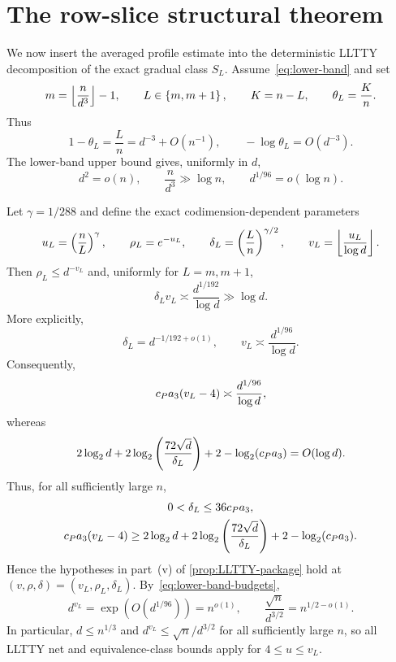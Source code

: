 \section{The row-slice structural theorem}\label{sec:structural}

We now insert the averaged profile estimate into the deterministic LLTTY decomposition of the exact gradual class $S_L$. Assume~\eqref{eq:lower-band} and set
\begin{equation}\label{eq:structural-parameters-basic}
  m=\left\lfloor \frac n{d^3}\right\rfloor-1,
  \qquad
  L\in\left\{m,m+1\right\},
  \qquad
  K=n-L,
  \qquad
  \theta_L=\frac Kn.
\end{equation}
Thus
\begin{equation}\label{eq:theta-L}
  1-\theta_L=\frac Ln=d^{-3}+O(n^{-1}),
  \qquad
  -\log\theta_L=O(d^{-3}).
\end{equation}
The lower-band upper bound gives, uniformly in $d$,
\begin{equation}\label{eq:lower-band-budgets}
  d^2=o(n),
  \qquad
  \frac n{d^3}\gg\log n,
  \qquad
  d^{1/96}=o(\log n).
\end{equation}

Let $\gamma=1/288$ and define the exact codimension-dependent parameters
\begin{equation}\label{eq:u-rho-delta-v}
  u_L=\left(\frac nL\right)^\gamma,
  \qquad
  \rho_L=e^{-u_L},
  \qquad
  \delta_L=\left(\frac Ln\right)^{\gamma/2},
  \qquad
  v_L=\left\lfloor \frac{u_L}{\log d}\right\rfloor.
\end{equation}
Then $\rho_L\le d^{-v_L}$ and, uniformly for $L=m,m+1$,
\begin{equation}\label{eq:delta-v-growth}
  \delta_Lv_L\asymp\frac{d^{1/192}}{\log d}\gg\log d.
\end{equation}
More explicitly,
\[
  \delta_L=d^{-1/192+o(1)},
  \qquad
  v_L\asymp\frac{d^{1/96}}{\log d}.
\]
Consequently,
\[
  c_P a_3(v_L-4)\asymp\frac{d^{1/96}}{\log d},
\]
whereas
\[
  2\log_2d+2\log_2\left(\frac{72\sqrt d}{\delta_L}\right)
  +2-\log_2(c_P a_3)=O(\log d).
\]
Thus, for all sufficiently large $n$,
\begin{equation}\label{eq:Pv-hypotheses}
  \begin{gathered}
  0<\delta_L\le36c_P a_3,\\
  c_P a_3(v_L-4)
  \ge2\log_2d+2\log_2\left(\frac{72\sqrt d}{\delta_L}\right)
  +2-\log_2(c_P a_3).
  \end{gathered}
\end{equation}
Hence the hypotheses in part~(v) of 
\cref{prop:LLTTY-package} hold at $(v,\rho,\delta)=(v_L,\rho_L,\delta_L)$. By~\eqref{eq:lower-band-budgets},
\[
  d^{v_L}=\exp(O(d^{1/96}))=n^{o(1)},
  \qquad
  \frac{\sqrt n}{d^{3/2}}=n^{1/2-o(1)}.
\]
In particular, $d\le n^{1/3}$ and $d^{v_L}\le\sqrt n/d^{3/2}$ for all sufficiently large $n$, so all LLTTY net and equivalence-class bounds apply for $4\le u\le v_L$.

